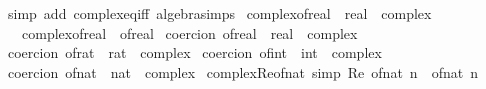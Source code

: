\begin{isabellebody}
\ {\isacharparenleft}{\kern0pt}simp\ add{\isacharcolon}{\kern0pt}\ complex{\isacharunderscore}{\kern0pt}eq{\isacharunderscore}{\kern0pt}iff\ algebra{\isacharunderscore}{\kern0pt}simps{\isacharparenright}{\kern0pt}\isanewline
{}\isamarkupfalse%
%
\endisatagproof
{\isafoldproof}%
%
\isadelimproof
\isanewline
%
\endisadelimproof
\isanewline
{}\isamarkupfalse%
%
\isadelimdocument
%
\endisadelimdocument
%
\isatagdocument
%
\isamarkuptrue%
%
\endisatagdocument
{\isafolddocument}%
%
\isadelimdocument
%
\endisadelimdocument
{}\isamarkupfalse%
\ complex{\isacharunderscore}{\kern0pt}of{\isacharunderscore}{\kern0pt}real\ {\isacharcolon}{\kern0pt}{\isacharcolon}{\kern0pt}\ {\isachardoublequoteopen}real\ {\isasymRightarrow}\ complex{\isachardoublequoteclose}\isanewline
\ \ \ {\isachardoublequoteopen}complex{\isacharunderscore}{\kern0pt}of{\isacharunderscore}{\kern0pt}real\ {\isasymequiv}\ of{\isacharunderscore}{\kern0pt}real{\isachardoublequoteclose}\isanewline
\isanewline
{}\isamarkupfalse%
\ {\isacharbrackleft}{\kern0pt}{\isacharbrackleft}{\kern0pt}coercion\ {\isachardoublequoteopen}of{\isacharunderscore}{\kern0pt}real\ {\isacharcolon}{\kern0pt}{\isacharcolon}{\kern0pt}\ real\ {\isasymRightarrow}\ complex{\isachardoublequoteclose}{\isacharbrackright}{\kern0pt}{\isacharbrackright}{\kern0pt}\isanewline
{}\isamarkupfalse%
\ {\isacharbrackleft}{\kern0pt}{\isacharbrackleft}{\kern0pt}coercion\ {\isachardoublequoteopen}of{\isacharunderscore}{\kern0pt}rat\ {\isacharcolon}{\kern0pt}{\isacharcolon}{\kern0pt}\ rat\ {\isasymRightarrow}\ complex{\isachardoublequoteclose}{\isacharbrackright}{\kern0pt}{\isacharbrackright}{\kern0pt}\isanewline
{}\isamarkupfalse%
\ {\isacharbrackleft}{\kern0pt}{\isacharbrackleft}{\kern0pt}coercion\ {\isachardoublequoteopen}of{\isacharunderscore}{\kern0pt}int\ {\isacharcolon}{\kern0pt}{\isacharcolon}{\kern0pt}\ int\ {\isasymRightarrow}\ complex{\isachardoublequoteclose}{\isacharbrackright}{\kern0pt}{\isacharbrackright}{\kern0pt}\isanewline
{}\isamarkupfalse%
\ {\isacharbrackleft}{\kern0pt}{\isacharbrackleft}{\kern0pt}coercion\ {\isachardoublequoteopen}of{\isacharunderscore}{\kern0pt}nat\ {\isacharcolon}{\kern0pt}{\isacharcolon}{\kern0pt}\ nat\ {\isasymRightarrow}\ complex{\isachardoublequoteclose}{\isacharbrackright}{\kern0pt}{\isacharbrackright}{\kern0pt}\isanewline
\isanewline
{}\isamarkupfalse%
\ complex{\isacharunderscore}{\kern0pt}Re{\isacharunderscore}{\kern0pt}of{\isacharunderscore}{\kern0pt}nat\ {\isacharbrackleft}{\kern0pt}simp{\isacharbrackright}{\kern0pt}{\isacharcolon}{\kern0pt}\ {\isachardoublequoteopen}Re\ {\isacharparenleft}{\kern0pt}of{\isacharunderscore}{\kern0pt}nat\ n{\isacharparenright}{\kern0pt}\ {\isacharequal}{\kern0pt}\ of{\isacharunderscore}{\kern0pt}nat\ n{\isachardoublequoteclose}\isanewline

\end{isabellebody}
